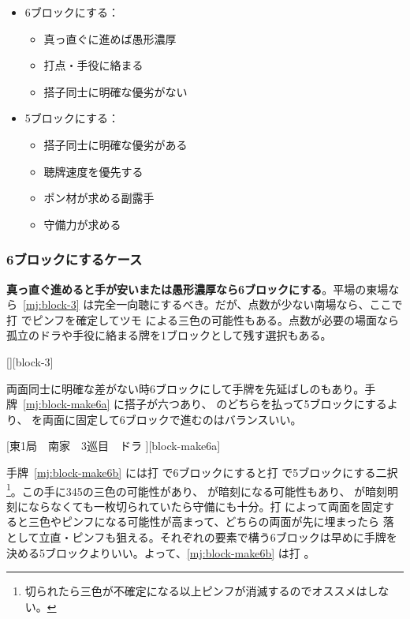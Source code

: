 \documentclass[../nankiru_main.tex]{subfiles}
\begin{document}
\begin{itemize}
  \item 6ブロックにする：
  \begin{itemize}
    \item 真っ直ぐに進めば愚形濃厚
    \item 打点・手役に絡まる
    \item 搭子同士に明確な優劣がない
  \end{itemize}
  \item 5ブロックにする：
  \begin{itemize}
    \item 搭子同士に明確な優劣がある
    \item 聴牌速度を優先する
    \item ポン材が求める副露手
    \item 守備力が求める
  \end{itemize}
\end{itemize}


\subsubsection*{6ブロックにするケース}

\textbf{真っ直ぐ進めると手が安いまたは愚形濃厚なら6ブロックにする}\citep[][p. 23]{uzaku-haikouritsu}。平場の東場なら~\ref{mj:block-3} は完全一向聴にするべき。だが、点数が少ない南場なら、ここで打  でピンフを確定してツモ  による三色の可能性もある。点数が必要の場面なら孤立のドラや手役に絡まる牌を1ブロックとして残す選択もある。

[][block-3]

両面同士に明確な差がない時6ブロックにして手牌を先延ばしのもあり\citep{yoteru-6block}。手牌~\ref{mj:block-make6a} に搭子が六つあり、 のどちらを払って5ブロックにするより、 を両面に固定して6ブロックで進むのはバランスいい。

[東1局　南家　3巡目　ドラ ][block-make6a]

手牌~\ref{mj:block-make6b} には打  で6ブロックにすると打  で5ブロックにする二択\footnote{ 切られたら三色が不確定になる以上ピンフが消滅するのでオススメはしない。}。この手に345の三色の可能性があり、 が暗刻になる可能性もあり、 が暗刻明刻にならなくても一枚切られていたら守備にも十分。打  によって両面を固定すると三色やピンフになる可能性が高まって、どちらの両面が先に埋まったら  落として立直・ピンフも狙える。それぞれの要素で構う6ブロックは早めに手牌を決める5ブロックよりいい。よって、\ref{mj:block-make6b} は打  \citep{yuusee-6block-1}。
\end{document}
